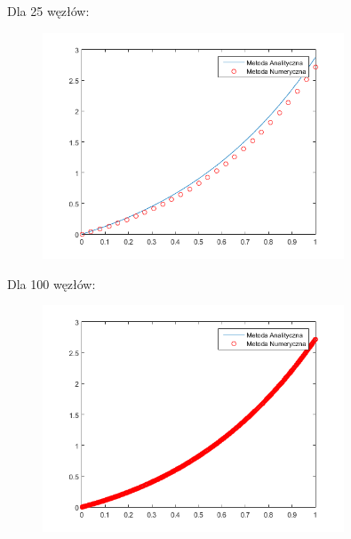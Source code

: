 \begin{samepage}
	Dla 25 węzłów:
	\begin{figure}[!ht]
		\begin{center}
			\includegraphics[width=0.8\textwidth]{Lab4/charts/zad4/1/25.png}
		\end{center}
	\end{figure}
	\FloatBarrier
\end{samepage}

\newpage
\begin{samepage}
	
	Dla 100 węzłów:
	\begin{figure}[!ht]
		\begin{center}
			\includegraphics[width=0.8\textwidth]{Lab4/charts/zad4/1/100.png}
		\end{center}
	\end{figure}
	\FloatBarrier
\end{samepage}

